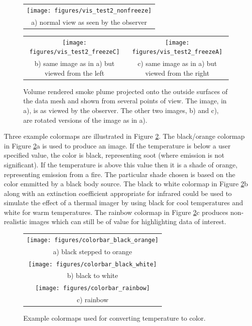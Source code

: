 {\begin{figure}[\figoptions]
\begin{center}
\begin{tabular}{c}
\texttt{[image: figures/vis\_test2\_nonfreeze]}\\
a) normal view as seen by the observer
\end{tabular}
\begin{tabular}{cc}
\texttt{[image: figures/vis\_test2\_freezeC]}&
\texttt{[image: figures/vis\_test2\_freezeA]}\\
b) same image as in a) but viewed from the left&c) same image as in a) but viewed from the right\\
\end{tabular}
\end{center}
\caption[Volume rendered smoke plume shown from several points of view.]{Volume rendered smoke plume projected onto the outside surfaces of the data mesh and shown  from several points of view.
The image, in a), is as viewed by the observer.  The other two images, b) and c), are rotated versions of the image as in a).
}
\label{fig:volplume_example}
\end{figure}

Three example colormaps  are illustrated in Figure \ref{fig:colormaps}.  
The black/orange colormap in Figure \ref{fig:colormaps}a 
is used to produce an image.  If the temperature is below a user specified value, the color is black, representing soot (where emission is not significant).  If the temperature is above this value then it is a shade of orange, representing emission from a fire.  The particular shade chosen is based on the color emmitted by a black body source.  
The black to white colormap in Figure \ref{fig:colormaps}b along with an extinction coefficient appropriate for infrared could be used to simulate the effect of a thermal imager by using black for cool temperatures and white for warm temperatures.  
The rainbow colormap in Figure \ref{fig:colormaps}c produces non-realistic images which can still be of value for highlighting data of interest.

\begin{figure}[\figoptions]
\begin{center}
\begin{tabular}{c}
\texttt{[image: figures/colorbar\_black\_orange]}\\
a) black stepped to orange\\
\texttt{[image: figures/colorbar\_black\_white]}\\
b) black to white\\
\texttt{[image: figures/colorbar\_rainbow]}\\
c) rainbow
\end{tabular}
\end{center}
\caption[Example colormaps used for converting temperature to color.]
{Example colormaps used for converting temperature to color.}
\label{fig:colormaps}
\end{figure}

}
